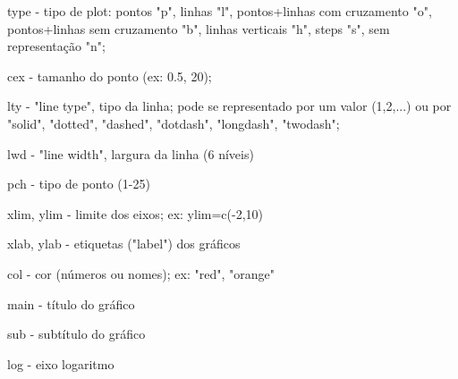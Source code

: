 \documentclass[
  letterpaper,
  DIV=11,
  numbers=noendperiod]{scrreprt}
\newenvironment{Shaded}{\begin{snugshade}}{\end{snugshade}}
\newcommand{\DecValTok}[1]{\textcolor[rgb]{0.68,0.00,0.00}{#1}}
\newcommand{\FloatTok}[1]{\textcolor[rgb]{0.68,0.00,0.00}{#1}}
\newcommand{\FunctionTok}[1]{\textcolor[rgb]{0.28,0.35,0.67}{#1}}
\newcommand{\NormalTok}[1]{\textcolor[rgb]{0.00,0.23,0.31}{#1}}
\newcommand{\OtherTok}[1]{\textcolor[rgb]{0.00,0.23,0.31}{#1}}
\newcommand{\SpecialCharTok}[1]{\textcolor[rgb]{0.37,0.37,0.37}{#1}}
\newcommand{\StringTok}[1]{\textcolor[rgb]{0.13,0.47,0.30}{#1}}
\begin{document}
\begin{Shaded}
\begin{Highlighting}[]
\NormalTok{type }\SpecialCharTok{{-}}\NormalTok{ tipo de plot}\SpecialCharTok{:}\NormalTok{ pontos }\StringTok{"p"}\NormalTok{, linhas }\StringTok{"l"}\NormalTok{, pontos}\SpecialCharTok{+}\NormalTok{linhas com cruzamento }\StringTok{"o"}\NormalTok{, pontos}\SpecialCharTok{+}\NormalTok{linhas sem cruzamento }\StringTok{"b"}\NormalTok{, linhas verticais }\StringTok{"h"}\NormalTok{, steps }\StringTok{"s"}\NormalTok{, sem representação }\StringTok{"n"}\NormalTok{;}

\NormalTok{cex }\SpecialCharTok{{-}}\NormalTok{ tamanho do }\FunctionTok{ponto}\NormalTok{ (ex}\SpecialCharTok{:} \FloatTok{0.5}\NormalTok{, }\DecValTok{20}\NormalTok{);}

\NormalTok{lty }\SpecialCharTok{{-}} \StringTok{"line type"}\NormalTok{, tipo da linha; pode se representado por um }\FunctionTok{valor}\NormalTok{ (}\DecValTok{1}\NormalTok{,}\DecValTok{2}\NormalTok{,...) ou por }\StringTok{"solid"}\NormalTok{, }\StringTok{"dotted"}\NormalTok{, }\StringTok{"dashed"}\NormalTok{, }\StringTok{"dotdash"}\NormalTok{, }\StringTok{"longdash"}\NormalTok{, }\StringTok{"twodash"}\NormalTok{;}

\NormalTok{lwd }\SpecialCharTok{{-}} \StringTok{"line width"}\NormalTok{, largura da }\FunctionTok{linha}\NormalTok{ (}\DecValTok{6}\NormalTok{ níveis)}

\NormalTok{pch }\SpecialCharTok{{-}}\NormalTok{ tipo de }\FunctionTok{ponto}\NormalTok{ (}\DecValTok{1{-}25}\NormalTok{)}

\NormalTok{xlim, ylim }\SpecialCharTok{{-}}\NormalTok{ limite dos eixos; ex}\SpecialCharTok{:}\NormalTok{ ylim}\OtherTok{=}\FunctionTok{c}\NormalTok{(}\SpecialCharTok{{-}}\DecValTok{2}\NormalTok{,}\DecValTok{10}\NormalTok{)}

\NormalTok{xlab, ylab }\SpecialCharTok{{-}} \FunctionTok{etiquetas}\NormalTok{ (}\StringTok{"label"}\NormalTok{) dos gráficos}

\NormalTok{col }\SpecialCharTok{{-}} \FunctionTok{cor}\NormalTok{ (números ou nomes); ex}\SpecialCharTok{:} \StringTok{"red"}\NormalTok{, }\StringTok{"orange"}

\NormalTok{main }\SpecialCharTok{{-}}\NormalTok{ título do gráfico}

\NormalTok{sub }\SpecialCharTok{{-}}\NormalTok{ subtítulo do gráfico}

\NormalTok{log }\SpecialCharTok{{-}}\NormalTok{ eixo logaritmo}
\end{Highlighting}
\end{Shaded}
\end{document}
